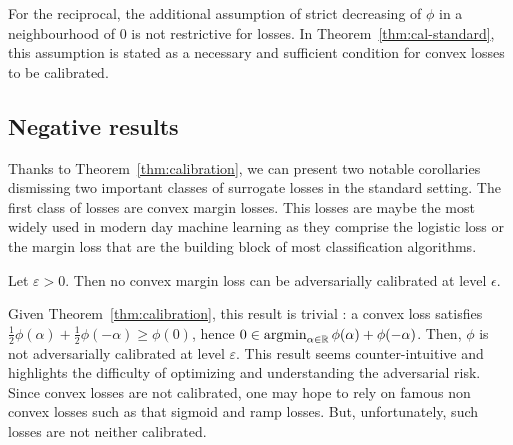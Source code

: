 

\begin{rmq} 




For the reciprocal, the additional assumption of strict decreasing of $\phi$ in a neighbourhood of $0$ is not restrictive for losses. In Theorem~\ref{thm:cal-standard}, this assumption is stated as a necessary and sufficient condition for convex losses to be calibrated.
\end{rmq}





\subsection{Negative results}

Thanks to Theorem~\ref{thm:calibration}, we can present two notable corollaries dismissing two important classes of surrogate losses in the standard setting. The first class of losses are convex margin losses. This losses are maybe the most widely used in modern day machine learning as they comprise the logistic loss or the margin loss that are the building block of most classification algorithms. %

\begin{coro} Let $\varepsilon>0$. Then no convex margin loss can be adversarially calibrated at level $\epsilon$.
\end{coro} 


Given Theorem~\ref{thm:calibration}, this result is trivial : a convex loss satisfies $\frac12\phi(\alpha)+\frac12\phi(-\alpha)\geq \phi(0)$, hence $0\in \operatorname*{argmin}_{\alpha\in\mathbb{R}}
\phi(\alpha)+\phi(-\alpha)$.  Then, $\phi$ is not adversarially calibrated at level $\varepsilon$. This result seems counter-intuitive and highlights the difficulty of optimizing and understanding the adversarial risk. Since  convex losses are not calibrated, one may hope to rely on  famous non convex losses such as that sigmoid and ramp losses. But, unfortunately, such losses are not neither calibrated.




